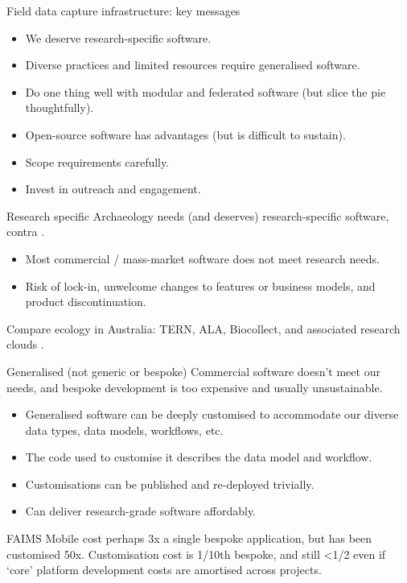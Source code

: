 \documentclass[aspectratio=169, 12pt]{beamer} %
\begin{document}
\begin{frame}{Field data capture infrastructure: key messages}
    \begin{itemize}[label=\textbullet]
        \item We deserve research-specific software.
        \item Diverse practices and limited resources require generalised software.
        \item Do one thing well with modular and federated software (but slice the pie thoughtfully).
        \item Open-source software has advantages (but is difficult to sustain). 
        \item Scope requirements carefully.
        \item Invest in outreach and engagement.
    \end{itemize}
\end{frame}

\begin{frame}{Research specific}
    Archaeology needs (and deserves) research-specific software, contra \cite{Roosevelt2015-kd}.
      \begin{itemize}[label=\textbullet]
        \item Most commercial / mass-market software does not meet research needs.
        \item Risk of lock-in, unwelcome changes to features or business models, and product discontinuation.
    \end{itemize}
    Compare ecology in Australia: TERN, ALA, Biocollect, and associated research clouds \cite{Tern2019-sp, Ala2019-by, Ala2019-cb}.
\end{frame}

\begin{frame}{Generalised (not generic or bespoke)}
  Commercial software doesn't meet our needs, and bespoke development is too expensive and usually unsustainable.
      \begin{itemize}[label=\textbullet]
        \item Generalised software can be deeply customised to accommodate our diverse data types, data models, workflows, etc.
        \item The code used to customise it describes the data model and workflow.
        \item Customisations can be published and re-deployed trivially.
        \item Can deliver research-grade software affordably.  
    \end{itemize}
    FAIMS Mobile cost perhaps 3x a single bespoke application, but has been customised 50x. Customisation cost is 1/10th bespoke, and still <1/2 even if `core' platform development costs are amortised across projects.
\end{frame}
\end{document}
